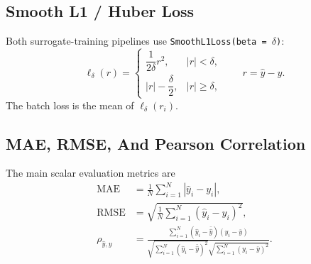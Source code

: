\documentclass[11pt]{article}
\begin{document}
\subsection{Smooth L1 / Huber Loss}
Both surrogate-training pipelines use \texttt{SmoothL1Loss(beta = $\delta$)}:
\begin{equation}
\ell_\delta(r)
=
\begin{cases}
\dfrac{1}{2\delta} r^2, & |r| < \delta, \\
|r| - \dfrac{\delta}{2}, & |r| \ge \delta,
\end{cases}
\qquad r = \hat{y} - y.
\end{equation}
The batch loss is the mean of $\ell_\delta(r_i)$.

\subsection{MAE, RMSE, And Pearson Correlation}
The main scalar evaluation metrics are
\begin{align}
\mathrm{MAE} &= \frac{1}{N}\sum_{i=1}^N |\hat{y}_i - y_i|, \\
\mathrm{RMSE} &= \sqrt{\frac{1}{N}\sum_{i=1}^N (\hat{y}_i - y_i)^2}, \\
\rho_{\hat{y},y}
&=
\frac{\sum_{i=1}^N (\hat{y}_i - \bar{\hat{y}})(y_i - \bar{y})}
{\sqrt{\sum_{i=1}^N (\hat{y}_i - \bar{\hat{y}})^2}
\sqrt{\sum_{i=1}^N (y_i - \bar{y})^2}}.
\end{align}
\end{document}
